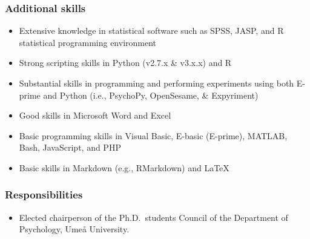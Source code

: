 \documentclass[]{article}
\providecommand{\tightlist}{%
  \setlength{\itemsep}{0pt}\setlength{\parskip}{0pt}}
\begin{document}
\subsubsection{Additional skills}\label{additional-skills}

\begin{itemize}
\tightlist
\item
  Extensive knowledge in statistical software such as SPSS, JASP, and R
  statistical programming environment
\item
  Strong scripting skills in Python (v2.7.x \& v3.x.x) and R
\item
  Substantial skills in programming and performing experiments using
  both E-prime and Python (i.e., PsychoPy, OpenSesame, \& Expyriment)
\item
  Good skills in Microsoft Word and Excel
\item
  Basic programming skills in Visual Basic, E-basic (E-prime), MATLAB,
  Bash, JavaScript, and PHP
\item
  Basic skills in Markdown (e.g., RMarkdown) and \LaTeX
\end{itemize}

\subsubsection{Responsibilities}\label{responsibilities}

\begin{itemize}
\tightlist
\item
  Elected chairperson of the Ph.D.~students Council of the Department of
  Psychology, Umeå University.
\end{itemize}
\end{document}
